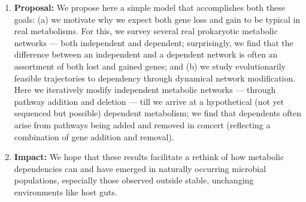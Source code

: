 \documentclass[10pt,a4paper]{article}
\begin{document}
\begin{enumerate}[leftmargin=*, label={}]
    \item \textbf{Proposal:} We propose here a simple model that accomplishes both these goals: (a) we motivate why we expect both gene loss and gain to be typical in real metabolisms. For this, we survey several real prokaryotic metabolic networks — both independent and dependent; surprisingly, we find that the difference between an independent and a dependent network is often an assortment of both lost and gained genes; and (b) we study evolutionarily feasible trajectories to dependency through dynamical network modification. Here we iteratively modify independent metabolic networks — through pathway addition and deletion  — till we arrive at a hypothetical (not yet sequenced but possible) dependent metabolism; we find that dependents often arise from pathways being added and removed in concert (reflecting a combination of gene addition and removal).

    \item \textbf{Impact:} We hope that these results facilitate a rethink of how metabolic dependencies can and have emerged in naturally occurring microbial populations, especially those observed outside stable, unchanging environments like host guts.

\end{enumerate}


\end{document}
